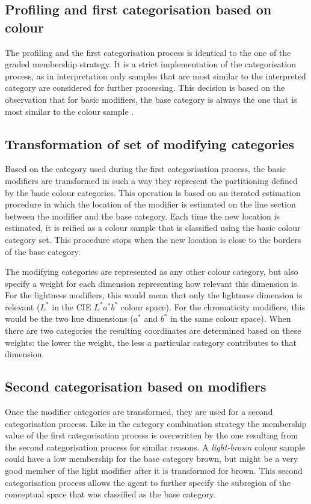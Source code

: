 \subsection{Profiling and first categorisation based on colour}

The profiling and the first categorisation process is identical to the
one of the graded membership strategy. It is a strict
implementation of the categorisation process, as in interpretation
only samples that are most similar to the interpreted category are
considered for further processing. This decision is based on the
observation that for basic modifiers, the base category is always
the one that is most similar to the colour sample
\citep{safuanova07russian}.

\subsection{Transformation of set of modifying categories}

Based on the category used during the first categorisation process,
the basic modifiers are transformed in such a way they represent 
the partitioning defined by the basic colour categories. This
operation is based on an iterated estimation procedure in which the
location of the modifier is estimated on the line section between the
modifier and the base category. Each time the new location is
estimated, it is reified as a colour sample that is classified using
the basic colour category set. This procedure stops when the new
location is close to the borders of the base category.

The modifying categories are represented as any other colour category,
but also specify a weight for each dimension representing how
relevant this dimension is. For the lightness modifiers, this would
mean that only the lightness dimension is relevant ($L^*$ in the CIE $L^*a^*b^*$ colour
space). For the chromaticity modifiers, this would be the two hue
dimensions ($a^*$ and $b^*$ in the same colour space). When there are two
categories the resulting coordinates are determined based on these
weights: the lower the weight, the less a particular category
contributes to that dimension.

\subsection{Second categorisation based on modifiers}

Once the modifier categories are transformed, they are used for a
second categorisation process. Like in the category combination
  strategy the membership value of the first categorisation process
is overwritten by the one resulting from the second categorisation
process for similar reasons. A \textit{light-brown} colour sample could
have a low membership for the base category brown, but might be a very
good member of the light modifier after it is transformed for
brown. This second categorisation process allows the agent to further
specify the subregion of the conceptual space that was classified as
the base category.

